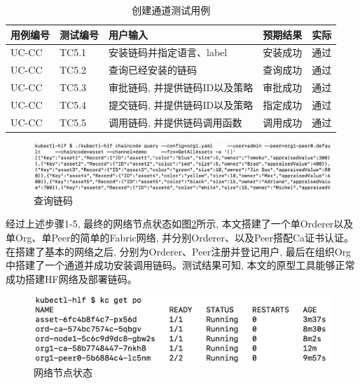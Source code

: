 {\footnotesize
\begin{longtable}[h]{m{45pt} m{45pt} m{180pt} m{50pt} m{20pt}}
    \caption[创建通道测试用例]{创建通道测试用例} \label{channel_test}\\
        \hline  
        用例编号&测试编号&用户输入&预期结果&实际\\
        \hline
        UC-CC & TC5.1 & 安装链码并指定语言、label & 安装成功 & 通过 \\
        \hline
        UC-CC & TC5.2 & 查询已经安装的链码 & 查询成功 & 通过 \\
        \hline
        UC-CC & TC5.3 & 审批链码, 并提供链码ID以及策略 & 审批成功 & 通过 \\
        \hline
        UC-CC & TC5.4 & 提交链码, 并提供链码ID以及策略 & 指定成功 & 通过 \\
        \hline
        UC-CC & TC5.5 & 调用链码, 并提供链码调用函数 & 调用成功 & 通过 \\
        \hline
    \end{longtable} 
}

\begin{figure}[h] %
    \centering %
    \includegraphics[width=1.0\textwidth]{FIGs/chapter5/chaincode.png} %
    \caption{查询链码} %
    \label{chaincode_test_result} %
\end{figure}%


经过上述步骤1-5, 最终的网络节点状态如图\ref{fabric_result}所示, 本文搭建了一个单Orderer以及单Org、单Peer的简单的Fabric网络, 并分别Orderer、以及Peer搭配Ca证书认证。在搭建了基本的网络之后, 分别为Orderer、Peer注册并登记用户, 最后在组织Org中搭建了一个通道并成功安装调用链码。测试结果可知, 本文的原型工具能够正常成功搭建HF网络及部署链码。


\begin{figure}[h] %
    \centering %
    \includegraphics[width=1.0\textwidth]{FIGs/chapter5/fabric_result.png} %
    \caption{网络节点状态} %
    \label{fabric_result} %
\end{figure}%


